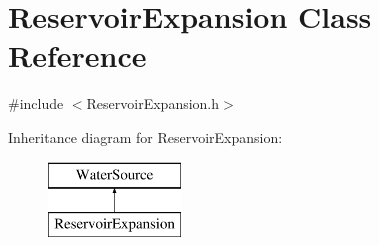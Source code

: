 \hypertarget{classReservoirExpansion}{}\section{Reservoir\+Expansion Class Reference}
\label{classReservoirExpansion}


{\ttfamily \#include $<$Reservoir\+Expansion.\+h$>$}

Inheritance diagram for Reservoir\+Expansion\+:\begin{figure}[H]
\begin{center}
\leavevmode
\includegraphics[height=2.000000cm]{classReservoirExpansion}
\end{center}
\end{figure}
